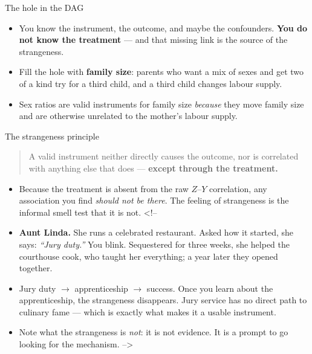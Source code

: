 \documentclass[
  11pt,
  ignorenonframetext,
  aspectratio=169,
]{beamer}
\providecommand{\tightlist}{%
  \setlength{\itemsep}{0pt}\setlength{\parskip}{0pt}}
\begin{document}
\begin{frame}{The hole in the DAG}
\protect{}\label{the-hole-in-the-dag}
\begin{center}
\end{center}

\begin{itemize}
\tightlist
\item
  You know the instrument, the outcome, and maybe the confounders.
  \textbf{You do not know the treatment} --- and that missing link is
  the source of the strangeness.
\item
  Fill the hole with \textbf{family size}: parents who want a mix of
  sexes and get two of a kind try for a third child, and a third child
  changes labour supply.
\item
  Sex ratios are valid instruments for family size \emph{because} they
  move family size and are otherwise unrelated to the mother's labour
  supply.
\end{itemize}
\end{frame}

\begin{frame}{The strangeness principle}
\protect{}\label{the-strangeness-principle-1}
\begin{quote}
A valid instrument neither directly causes the outcome, nor is
correlated with anything else that does --- \textbf{except through the
treatment.}
\end{quote}

\begin{itemize}
\tightlist
\item
  Because the treatment is absent from the raw \(Z\)--\(Y\) correlation,
  any association you find \emph{should not be there}. The feeling of
  strangeness is the informal smell test that it is not. \textless!--
\item
  \textbf{Aunt Linda.} She runs a celebrated restaurant. Asked how it
  started, she says: \emph{``Jury duty.''} You blink. Sequestered for
  three weeks, she helped the courthouse cook, who taught her
  everything; a year later they opened together.
\item
  Jury duty \(\to\) apprenticeship \(\to\) success. Once you learn about
  the apprenticeship, the strangeness disappears. Jury service has no
  direct path to culinary fame --- which is exactly what makes it a
  usable instrument.
\item
  Note what the strangeness is \emph{not}: it is not evidence. It is a
  prompt to go looking for the mechanism. --\textgreater{}
\end{itemize}
\end{frame}
\end{document}
